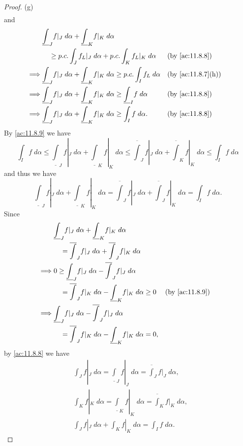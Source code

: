 \begin{proof}{(g)}
\begin{align*}
  \end{align*}
  and
  \begin{align*}
             & \underline{\int}_J f|_J \; d \alpha + \underline{\int}_K f|_K \; d \alpha                                                                            \\
             & \quad \geq p.c. \int_J f_L|_J \; d \alpha + p.c. \int_K f_L|_K \; d \alpha                                      &  & \text{(by \cref{ac:11.8.8})}    \\
    \implies & \underline{\int}_J f|_J \; d \alpha + \underline{\int}_K f|_K \; d \alpha \geq p.c. \int_I f_L \; d \alpha      &  & \text{(by \cref{ac:11.8.7}(h))} \\
    \implies & \underline{\int}_J f|_J \; d \alpha + \underline{\int}_K f|_K \; d \alpha \geq \underline{\int}_I f \; d \alpha &  & \text{(by \cref{ac:11.8.8})}    \\
    \implies & \underline{\int}_J f|_J \; d \alpha + \underline{\int}_K f|_K \; d \alpha \geq \int_I f \; d \alpha.            &  & \text{(by \cref{ac:11.8.8})}
  \end{align*}
  By \cref{ac:11.8.9} we have
  \[
    \int_I f \; d \alpha \leq \underline{\int}_J f|_J \; d \alpha + \underline{\int}_K f|_K \; d \alpha \leq \overline{\int}_J f|_J \; d \alpha + \overline{\int}_K f|_K \; d \alpha \leq \int_I f \; d \alpha
  \]
  and thus we have
  \[
    \underline{\int}_J f|_J \; d \alpha + \underline{\int}_K f|_K \; d \alpha = \overline{\int}_J f|_J \; d \alpha + \overline{\int}_J f|_K \; d \alpha = \int_I f \; d \alpha.
  \]
  Since
  \begin{align*}
             & \underline{\int}_J f|_J \; d \alpha + \underline{\int}_K f|_K \; d \alpha                                                 \\
             & \quad = \overline{\int}_J f|_J \; d \alpha + \overline{\int}_J f|_K \; d \alpha                                           \\
    \implies & 0 \geq \underline{\int}_J f|_J \; d \alpha - \overline{\int}_J f|_J \; d \alpha                                           \\
             & \quad = \overline{\int}_J f|_K \; d \alpha - \underline{\int}_K f|_K \; d \alpha \geq 0 &  & \text{(by \cref{ac:11.8.9})} \\
    \implies & \underline{\int}_J f|_J \; d \alpha - \overline{\int}_J f|_J \; d \alpha                                                  \\
             & \quad = \overline{\int}_J f|_K \; d \alpha - \underline{\int}_K f|_K \; d \alpha = 0,
  \end{align*}
  by \cref{ac:11.8.8} we have
  \begin{align*}
     & \int_J f|_J \; d \alpha = \underline{\int}_J f|_J \; d \alpha = \overline{\int}_J f|_J \; d \alpha, \\
     & \int_K f|_K \; d \alpha = \underline{\int}_K f|_K \; d \alpha = \overline{\int}_K f|_K \; d \alpha, \\
     & \int_J f|_J \; d \alpha + \int_K f|_K \; d \alpha = \int_I f \; d \alpha.
  \end{align*}
\end{proof}

